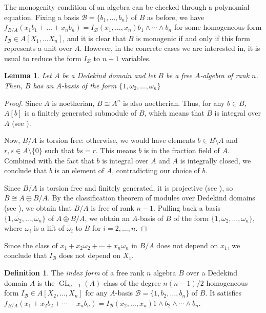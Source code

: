 \documentclass[oneside]{amsart}
\DeclareMathOperator{\gl}{GL}
\newtheorem{lemma}[X]{Lemma}
\theoremstyle{definition}
\newtheorem{definition}[X]{Definition}
\begin{document}
The monogenity condition of an algebra can be checked through  a polynomial equation. Fixing a basis $\mathcal{B}=\{b_1,\dots, b_n\}$ of $B$ as before, we have $f_{B/A}(x_1 b_1+\dots+x_n b_n)=I_{\mathcal {B}}(x_1,\dots,x_n)b_1\wedge\cdots\wedge b_n$ for some homogeneous form $I_{\mathcal{B}}\in A[X_1,\dots X_n]$, and it is clear that $B$ is monogenic if and only if this form represents a unit over $A$. However, in the concrete cases we are  interested in, it is usual to reduce the form $I_{\mathcal{B}}$ to $n-1$ variables.

\begin{lemma}
    Let $A$ be a Dedekind domain and let $B$ be a free $A$-algebra of rank $n$. Then, $B$ has an $A$-basis of the form $\{1,\omega_2,\dots,\omega_n\}$
\end{lemma}
\begin{proof}
    Since $A$ is noetherian, $B \cong A^n$ is also noetherian. Thus, for any $b \in B$, $A[b]$ is a finitely generated submodule of $B$, which means that $B$ is integral over $A$ (see \cite[Prop. 2.4]{milneANT}). 
    
    Now, $B/A$ is torsion free: otherwise, we would have elements $b \in B\setminus A$ and $r, s \in A\setminus\{0\}$ such that $bs = r$. This means $b$ is in the fraction field of $A$. Combined with the fact that $b$ is integral over $A$ and $A$ is integrally closed, we conclude that $b$ is an element of $A$, contradicting our choice of $b$.

    Since $B/A$ is torsion free and finitely generated, it is projective (see \cite[\S 16.3, Cor. 23]{AAlgebra}), so $B \cong A \oplus B/A$. By the classification theorem of modules over Dedekind domains (see \cite[\S 16.2, Thm. 22]{AAlgebra}), we obtain that $B/A$ is free of rank $n - 1$. Pulling back  a basis $\{1,\overline{\omega}_2,\dots, \overline{\omega}_n\}$ of $A\oplus B/A$, we obtain an $A$-basis of $B$ of the form $\{1, \omega_2,\dots, \omega_n\}$, where $\omega_i$ is a lift of $\overline{\omega}_i$ to $B$ for $i = 2, \dots, n$.
\end{proof}

Since the class of $x_1 + x_2\omega_2 + \cdots + x_n\omega_n$ in $B/A$ does not depend on $x_1$, we conclude that $I_{\mathcal{B}}$ does not depend on $X_1$.

\begin{definition}
    The \textit{index form} of a free rank $n$ algebra $B$ over a Dedekind domain $A$ is the $\gl_{n-1}(A)$-class of the degree $n(n-1)/2$ homogeneous form $I_{\mathcal{B}}\in A[X_2,\dots, X_n]$ for any $A$-basis $\mathcal{B}=\{1,b_2,\dots, b_n\}$ of $B$.
It satisfies
$ 
f_{B/A}(x_1 + x_2b_2 + \cdots + x_n b_n)=I_{\mathcal {B}}(x_2, \dots, x_n) 1\wedge b_2 \wedge\cdots\wedge b_n.
$
\end{definition}
\end{document}

